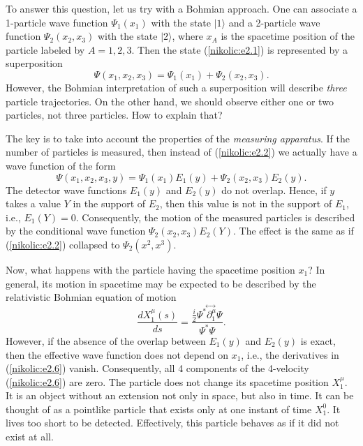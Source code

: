 \documentclass[12pt,twoside]{report} %
\begin{document}
To answer this question, let us try with a Bohmian approach. 
One can associate a 1-particle wave function
$\Psi_1(x_1)$ with the state $|1\rangle$ and a 2-particle  wave function
$\Psi_2(x_2,x_3)$ with the state $|2\rangle$, where $x_A$ is the spacetime
position of the particle labeled by $A=1,2,3$.
Then the state (\ref{nikolic:e2.1}) is represented by a superposition
\begin{equation}\label{nikolic:e2.2}
\Psi(x_1,x_2,x_3) = \Psi_1(x_1) + \Psi_2(x_2,x_3) .
\end{equation} 
However, the Bohmian interpretation of such a superposition will describe
{\em three} particle trajectories. On the other hand, we should observe
either one or two particles, not three particles. How to explain that?

The key is to take into account the properties of the {\em measuring apparatus}. 
If the number of particles is measured, then instead of (\ref{nikolic:e2.2}) we actually have
a wave function of the form
\begin{equation}\label{nikolic:e2.5}
\Psi(x_1,x_2,x_3,y) = \Psi_1(x_1)E_1(y) + \Psi_2(x_2,x_3)E_2(y) .
\end{equation}
The detector wave functions $E_1(y)$ and $E_2(y)$ do not overlap. 
Hence, if $y$ takes a value $Y$ in the support of $E_2$, then this value is not
in the support of $E_1$, i.e., $E_1(Y)=0$. Consequently, the motion of the
measured particles is described by the conditional wave function 
$\Psi_2(x_2,x_3)E_2(Y)$.
The effect is the same as if (\ref{nikolic:e2.2}) collapsed to $\Psi_2(x^2,x^3)$.

Now, what happens with the particle having the spacetime position $x_1$?
In general, its motion in spacetime may be expected to be
described by the relativistic Bohmian equation of motion 
\begin{equation}\label{nikolic:e2.6}
\frac{dX^{\mu}_1(s)}{ds} = \frac{ 
\frac{i}{2} \Psi^*\!\stackrel{\leftrightarrow\;}{\partial^{\mu}_1}\! \Psi }{\Psi^*\Psi} .
\end{equation}
However,
if the absence of the overlap between $E_1(y)$ and $E_2(y)$ is exact, then
the effective wave function does not depend on $x_1$, i.e., the derivatives in
(\ref{nikolic:e2.6}) vanish. Consequently, all 4 components of the 4-velocity (\ref{nikolic:e2.6})
are zero. The particle does not change its spacetime position $X^{\mu}_1$. 
It is an object without an extension not only in space, but also in time. 
It can be thought of as a pointlike particle that exists only at one instant of time
$X^{0}_1$. It lives too short to be detected. Effectively, this particle 
behaves as if it did not exist at all.
\end{document}
